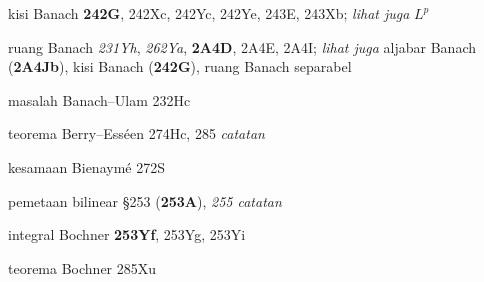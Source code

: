 kisi Banach {\bf 242G}, 242Xc, 242Yc, 242Ye, 243E, 243Xb; {\it lihat juga} $L^p$






ruang Banach {\it 231Yh}, {\it 262Ya}, {\bf 2A4D}, 2A4E, 2A4I; {\it lihat juga} aljabar Banach ({\bf 2A4Jb}), kisi Banach ({\bf 242G}), ruang Banach separabel


masalah Banach--Ulam 232Hc












































 teorema Berry--Ess\'een 274Hc, 285 {\it catatan}












 kesamaan Bienaym\'e 272S




 pemetaan bilinear \S253 ({\bf 253A}), {\it 255 catatan}












 integral Bochner {\bf 253Yf}, 253Yg, 253Yi


teorema Bochner 285Xu































